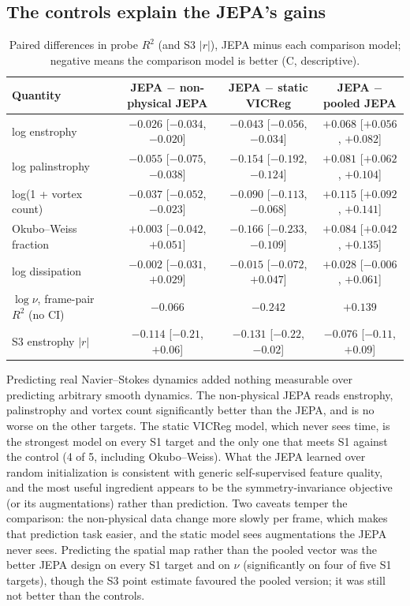 \documentclass[10pt]{article}
\begin{document}
\subsection{The controls explain the JEPA's gains}\label{sec:4.4}

\begin{table}[htbp]
\centering
\small
\caption{Paired differences in probe $R^2$ (and S3 $|r|$), JEPA minus each comparison model; negative means the comparison model is better (C, descriptive).}
\label{tab:2}
\begin{tabularx}{\linewidth}{>{\raggedright\arraybackslash}Xccc}
\toprule
Quantity & JEPA $-$ non-physical JEPA & JEPA $-$ static VICReg & JEPA $-$ pooled JEPA \\
\midrule
log enstrophy & $-0.026$ [$-0.034$, $-0.020$] & $-0.043$ [$-0.056$, $-0.034$] & $+0.068$ [$+0.056$, $+0.082$] \\
log palinstrophy & $-0.055$ [$-0.075$, $-0.038$] & $-0.154$ [$-0.192$, $-0.124$] & $+0.081$ [$+0.062$, $+0.104$] \\
log(1 + vortex count) & $-0.037$ [$-0.052$, $-0.023$] & $-0.090$ [$-0.113$, $-0.068$] & $+0.115$ [$+0.092$, $+0.141$] \\
Okubo--Weiss fraction & $+0.003$ [$-0.042$, $+0.051$] & $-0.166$ [$-0.233$, $-0.109$] & $+0.084$ [$+0.042$, $+0.135$] \\
log dissipation & $-0.002$ [$-0.031$, $+0.029$] & $-0.015$ [$-0.072$, $+0.047$] & $+0.028$ [$-0.006$, $+0.061$] \\
$\log\nu$, frame-pair $R^2$ (no CI) & $-0.066$ & $-0.242$ & $+0.139$ \\
S3 enstrophy $|r|$ & $-0.114$ [$-0.21$, $+0.06$] & $-0.131$ [$-0.22$, $-0.02$] & $-0.076$ [$-0.11$, $+0.09$] \\
\bottomrule
\end{tabularx}
\end{table}

Predicting real Navier--Stokes dynamics added nothing measurable over predicting arbitrary smooth dynamics. The non-physical JEPA reads enstrophy, palinstrophy and vortex count significantly better than the JEPA, and is no worse on the other targets. The static VICReg model, which never sees time, is the strongest model on every S1 target and the only one that meets S1 against the control (4 of 5, including Okubo--Weiss). What the JEPA learned over random initialization is consistent with generic self-supervised feature quality, and the most useful ingredient appears to be the symmetry-invariance objective (or its augmentations) rather than prediction. Two caveats temper the comparison: the non-physical data change more slowly per frame, which makes that prediction task easier, and the static model sees augmentations the JEPA never sees. Predicting the spatial map rather than the pooled vector was the better JEPA design on every S1 target and on $\nu$ (significantly on four of five S1 targets), though the S3 point estimate favoured the pooled version; it was still not better than the controls.
\end{document}
